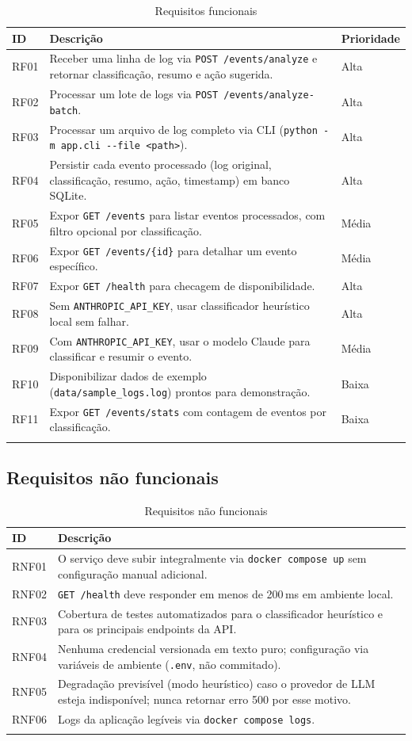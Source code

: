 \documentclass[11pt,a4paper]{article}
\begin{document}
\begin{longtable}{p{1.4cm}p{10.5cm}p{1.6cm}}
\toprule
\textbf{ID} & \textbf{Descrição} & \textbf{Prioridade} \\
\midrule
\endhead
RF01 & Receber uma linha de log via \verb|POST /events/analyze| e retornar classificação, resumo e ação sugerida. & Alta \\
RF02 & Processar um lote de logs via \verb|POST /events/analyze-batch|. & Alta \\
RF03 & Processar um arquivo de log completo via CLI (\verb|python -m app.cli --file <path>|). & Alta \\
RF04 & Persistir cada evento processado (log original, classificação, resumo, ação, timestamp) em banco SQLite. & Alta \\
RF05 & Expor \verb|GET /events| para listar eventos processados, com filtro opcional por classificação. & Média \\
RF06 & Expor \verb|GET /events/{id}| para detalhar um evento específico. & Média \\
RF07 & Expor \verb|GET /health| para checagem de disponibilidade. & Alta \\
RF08 & Sem \verb|ANTHROPIC_API_KEY|, usar classificador heurístico local sem falhar. & Alta \\
RF09 & Com \verb|ANTHROPIC_API_KEY|, usar o modelo Claude para classificar e resumir o evento. & Média \\
RF10 & Disponibilizar dados de exemplo (\verb|data/sample_logs.log|) prontos para demonstração. & Baixa \\
RF11 & Expor \verb|GET /events/stats| com contagem de eventos por classificação. & Baixa \\
\bottomrule
\caption{Requisitos funcionais}
\end{longtable}

\subsection{Requisitos não funcionais}

\begin{longtable}{p{1.6cm}p{12cm}}
\toprule
\textbf{ID} & \textbf{Descrição} \\
\midrule
\endhead
RNF01 & O serviço deve subir integralmente via \verb|docker compose up| sem configuração manual adicional. \\
RNF02 & \verb|GET /health| deve responder em menos de 200\,ms em ambiente local. \\
RNF03 & Cobertura de testes automatizados para o classificador heurístico e para os principais endpoints da API. \\
RNF04 & Nenhuma credencial versionada em texto puro; configuração via variáveis de ambiente (\verb|.env|, não commitado). \\
RNF05 & Degradação previsível (modo heurístico) caso o provedor de LLM esteja indisponível; nunca retornar erro 500 por esse motivo. \\
RNF06 & Logs da aplicação legíveis via \verb|docker compose logs|. \\
\bottomrule
\caption{Requisitos não funcionais}
\end{longtable}
\end{document}

